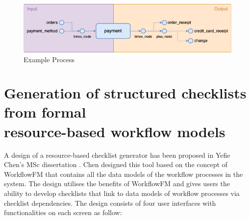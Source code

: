 \begin{figure}[ht!]
    \centering
    \includegraphics[width=\textwidth]{overleaf/images/process_flows.png}
    \caption{Example Process}
    \label{fig:process_flows}
\end{figure}

\section{Generation of structured checklists from formal \\resource-based workflow models}
\label{background:chens_design}

A design of a resource-based checklist generator has been proposed in Yefie Chen's MSc dissertation \cite{checklistdesign}. Chen designed this tool based on the concept of WorkflowFM that contains all the data models of the workflow processes in the system. The design utilises the benefits of WorkflowFM and gives users the ability to develop checklists that link to data models of workflow processes via checklist dependencies.
The design consists of four user interfaces with functionalities on each screen as follow:

